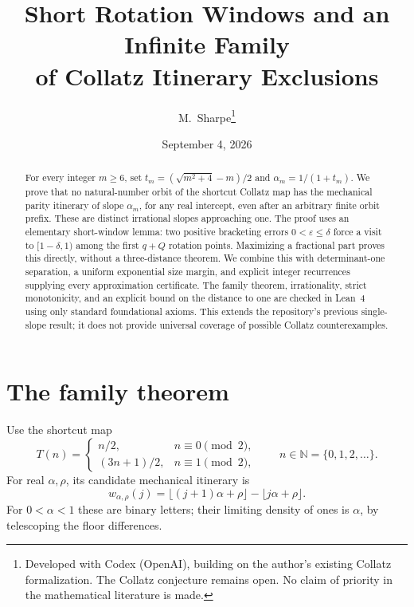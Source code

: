 \documentclass[11pt]{article}
\title{Short Rotation Windows and an Infinite Family\\of Collatz Itinerary Exclusions}
\author{M.~Sharpe\thanks{Developed with Codex (OpenAI), building on the author's existing Collatz formalization. The Collatz conjecture remains open. No claim of priority in the mathematical literature is made.}}
\date{September 4, 2026}
\theoremstyle{remark}
\newcommand{\N}{\mathbb N}
\begin{document}
\maketitle
\begin{abstract}
For every integer $m\ge6$, set
$t_m=(\sqrt{m^2+4}-m)/2$ and $\alpha_m=1/(1+t_m)$.
We prove that no natural-number orbit of the shortcut Collatz map has
the mechanical parity itinerary of slope $\alpha_m$, for any real
intercept, even after an arbitrary finite orbit prefix.
These are distinct irrational slopes approaching one. The proof uses
an elementary short-window lemma: two positive bracketing errors
$0<\varepsilon\le\delta$ force a visit to $[1-\delta,1)$ among the first
$q+Q$ rotation points. Maximizing a fractional part proves this directly,
without a three-distance theorem. We combine this with determinant-one
separation, a uniform exponential size margin, and explicit integer
recurrences supplying every approximation certificate. The family theorem,
irrationality, strict monotonicity, and an explicit bound on the distance
to one are checked in Lean~4 using only standard foundational axioms.
This extends the repository's previous single-slope result; it does not
provide universal coverage of possible Collatz counterexamples.
\end{abstract}

\section{The family theorem}
Use the shortcut map
\[
T(n)=\begin{cases}n/2,&n\equiv0\pmod2,\\(3n+1)/2,&n\equiv1\pmod2,\end{cases}
\qquad n\in\N=\{0,1,2,\ldots\}.
\]
For real $\alpha,\rho$, its candidate mechanical itinerary is
\begin{equation}\label{eq:word}
w_{\alpha,\rho}(j)=\lfloor(j+1)\alpha+\rho\rfloor-\lfloor j\alpha+\rho\rfloor.
\end{equation}
For $0<\alpha<1$ these are binary letters; their limiting density of ones
is $\alpha$, by telescoping the floor differences.
\end{document}
